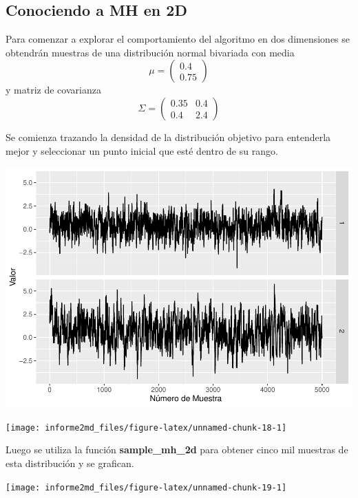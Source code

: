 \documentclass[
]{article}
\begin{document}
\hypertarget{conociendo-a-mh-en-2d}{%
\subsection{Conociendo a MH en 2D}\label{conociendo-a-mh-en-2d}}

Para comenzar a explorar el comportamiento del algoritmo en dos
dimensiones se obtendrán muestras de una distribución normal bivariada
con media \[ \mu = \begin{pmatrix}
   0.4 \\
   0.75
\end{pmatrix} \] y matriz de covarianza \[\Sigma=\begin{pmatrix}
   0.35 & 0.4 \\
   0.4 & 2.4
\end{pmatrix} \]

Se comienza trazando la densidad de la distribución objetivo para
entenderla mejor y seleccionar un punto inicial que esté dentro de su
rango.

\begin{center}\includegraphics{informe2md_files/figure-latex/unnamed-chunk-17-1} \end{center}

\begin{center}\texttt{[image: informe2md\_files/figure-latex/unnamed-chunk-18-1]} \end{center}

Luego se utiliza la función \textbf{sample\_mh\_2d} para obtener cinco
mil muestras de esta distribución y se grafican.

\begin{center}\texttt{[image: informe2md\_files/figure-latex/unnamed-chunk-19-1]} \end{center}
\end{document}

